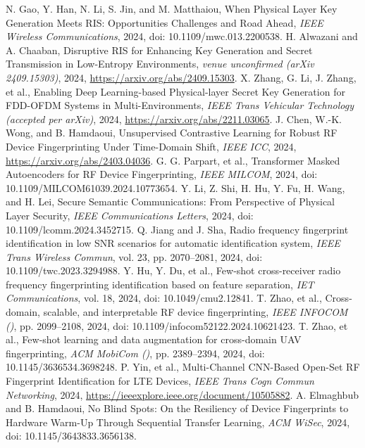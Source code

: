 N. Gao, Y. Han, N. Li, S. Jin, and M. Matthaiou, When Physical Layer Key Generation Meets RIS: Opportunities Challenges and Road Ahead, \emph{IEEE Wireless Communications}, 2024, doi: 10.1109/mwc.013.2200538.
H. Alwazani and A. Chaaban, Disruptive RIS for Enhancing Key Generation and Secret Transmission in Low-Entropy Environments, \emph{venue unconfirmed (arXiv 2409.15303)}, 2024, \url{https://arxiv.org/abs/2409.15303}.
X. Zhang, G. Li, J. Zhang, et al., Enabling Deep Learning-based Physical-layer Secret Key Generation for FDD-OFDM Systems in Multi-Environments, \emph{IEEE Trans Vehicular Technology (accepted per arXiv)}, 2024, \url{https://arxiv.org/abs/2211.03065}.
J. Chen, W.-K. Wong, and B. Hamdaoui, Unsupervised Contrastive Learning for Robust RF Device Fingerprinting Under Time-Domain Shift, \emph{IEEE ICC}, 2024, \url{https://arxiv.org/abs/2403.04036}.
G. G. Parpart, et al., Transformer Masked Autoencoders for RF Device Fingerprinting, \emph{IEEE MILCOM}, 2024, doi: 10.1109/MILCOM61039.2024.10773654.
Y. Li, Z. Shi, H. Hu, Y. Fu, H. Wang, and H. Lei, Secure Semantic Communications: From Perspective of Physical Layer Security, \emph{IEEE Communications Letters}, 2024, doi: 10.1109/lcomm.2024.3452715.
Q. Jiang and J. Sha, Radio frequency fingerprint identification in low SNR scenarios for automatic identification system, \emph{IEEE Trans Wireless Commun}, vol. 23, pp. 2070--2081, 2024, doi: 10.1109/twc.2023.3294988.
Y. Hu, Y. Du, et al., Few-shot cross-receiver radio frequency fingerprinting identification based on feature separation, \emph{IET Communications}, vol. 18, 2024, doi: 10.1049/cmu2.12841.
T. Zhao, et al., Cross-domain, scalable, and interpretable RF device fingerprinting, \emph{IEEE INFOCOM ()}, pp. 2099--2108, 2024, doi: 10.1109/infocom52122.2024.10621423.
T. Zhao, et al., Few-shot learning and data augmentation for cross-domain UAV fingerprinting, \emph{ACM MobiCom ()}, pp. 2389--2394, 2024, doi: 10.1145/3636534.3698248.
P. Yin, et al., Multi-Channel CNN-Based Open-Set RF Fingerprint Identification for LTE Devices, \emph{IEEE Trans Cogn Commun Networking}, 2024, \url{https://ieeexplore.ieee.org/document/10505882}.
A. Elmaghbub and B. Hamdaoui, No Blind Spots: On the Resiliency of Device Fingerprints to Hardware Warm-Up Through Sequential Transfer Learning, \emph{ACM WiSec}, 2024, doi: 10.1145/3643833.3656138.
